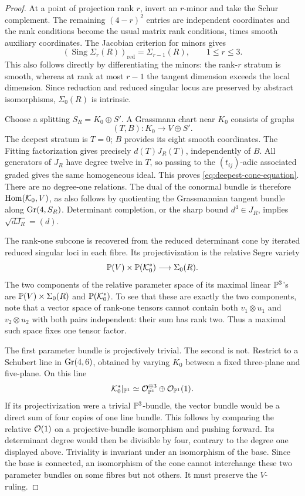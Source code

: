 \begin{proof}
At a point of projection rank \(r\), invert an \(r\)-minor
and take the Schur complement.  The remaining \((4-r)^2\)
entries are independent coordinates and the rank conditions become
the usual matrix rank conditions, times smooth auxiliary coordinates.
The Jacobian criterion for minors gives
\[
 (\operatorname{Sing}\Sigma_r(R))_{\mathrm{red}}
       =\Sigma_{r-1}(R),\qquad 1\le r\le3.
\]
This also follows directly by differentiating the minors: the
rank-\(r\) stratum is smooth, whereas at rank at most \(r-1\)
the tangent dimension exceeds the local dimension.  Since reduction
and reduced singular locus are preserved by abstract isomorphisms,
\(\Sigma_0(R)\) is intrinsic.

Choose a splitting \(S_R=K_0\oplus S'\).  A Grassmann chart
near \(K_0\) consists of graphs
\[
 (T,B):K_0\longrightarrow V\oplus S'.
\]
The deepest stratum is \(T=0\); \(B\) provides its eight
smooth coordinates.  The Fitting factorization gives precisely
\(d(T)J_R(T)\), independently of \(B\).  All generators of
\(J_R\) have degree twelve in \(T\), so passing to the
\((t_{ij})\)-adic associated graded gives the same homogeneous
ideal.  This proves \eqref{eq:deepest-cone-equation}.  There are
no degree-one relations.  The dual of the conormal bundle is therefore
\(\operatorname{Hom}(\mathcal K_0,V)\), as also follows by quotienting the
Grassmannian tangent bundle along \(\operatorname{Gr}(4,S_R)\).  Determinant
completion, or the sharp bound \(d^4\in J_R\), implies
\(\sqrt{dJ_R}=(d)\).

The rank-one subcone is recovered from the reduced determinant cone
by iterated reduced singular loci in each fibre.  Its projectivization
is the relative Segre variety
\[
 \mathbb P(V)\times\mathbb P(\mathcal K_0^*)
          \longrightarrow\Sigma_0(R).
\]
The two components of the relative parameter space of its maximal
linear \(\mathbb P^3\)'s are \(\mathbb P(V)\times\Sigma_0(R)\)
and \(\mathbb P(\mathcal K_0^*)\).  To see that these are exactly
the two components, note that a vector space of rank-one tensors
cannot contain both \(v_1\otimes u_1\) and
\(v_2\otimes u_2\) with both pairs independent: their sum has
rank two.  Thus a maximal such space fixes one tensor factor.

The first parameter bundle is projectively trivial.  The second is
not.  Restrict to a Schubert line in \(\operatorname{Gr}(4,6)\), obtained by
varying \(K_0\) between a fixed three-plane and five-plane.  On
this line
\[
 \mathcal K_0^*|_{\mathbb P^1}\simeq
 \mathcal O_{\mathbb P^1}^{\oplus3}\oplus\mathcal O_{\mathbb P^1}(1).
\]
If its projectivization were a trivial \(\mathbb P^3\)-bundle, the
vector bundle would be a direct sum of four copies of one line
bundle.  This follows by comparing the relative \(\mathcal O(1)\)
on a projective-bundle isomorphism and pushing forward.  Its
determinant degree would then be divisible by four, contrary to the
degree one displayed above.  Triviality is invariant under an
isomorphism of the base.  Since the base is connected, an isomorphism
of the cone cannot interchange these two parameter bundles on some
fibres but not others.  It must preserve the \(V\)-ruling.
\end{proof}

